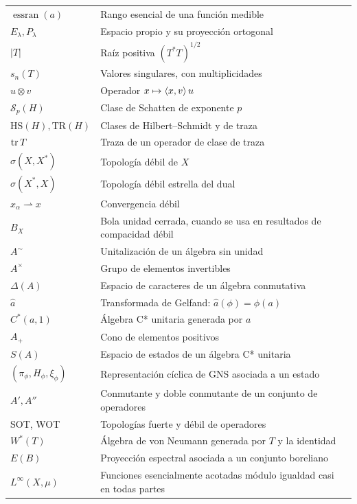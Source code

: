 \begin{longtable}{@{}p{}p{}r@{}}
$\operatorname{essran}(a)$ & Rango esencial de una función medible & \pageref{v3:multiplicadores}\\
$E_\lambda,P_\lambda$ & Espacio propio y su proyección ortogonal & \pageref{v3:espectral-compacto}\\
$|T|$ & Raíz positiva $(T^*T)^{1/2}$ & \pageref{v3:raiz-compacta}\\
$s_n(T)$ & Valores singulares, con multiplicidades & \pageref{v3:singulares}\\
$u\otimes v$ & Operador $x\mapsto\left\langle x,v\right\rangle u$ & \pageref{v3:traza-variacional}\\
$\mathcal S_p(H)$ & Clase de Schatten de exponente $p$ & \pageref{v3:schatten-banach}\\
$\mathrm{HS}(H),\mathrm{TR}(H)$ & Clases de Hilbert--Schmidt y de traza & \pageref{v3:schatten-banach}\\
$\operatorname{tr} T$ & Traza de un operador de clase de traza & \pageref{v3:traza-variacional}\\
$\sigma(X,X^*)$ & Topología débil de $X$ & \pageref{v3:topologia-debil}\\
$\sigma(X^*,X)$ & Topología débil estrella del dual & \pageref{v3:topologia-debil-estrella}\\
$x_\alpha\rightharpoonup x$ & Convergencia débil & \pageref{v3:convergencia-debil}\\
$B_X$ & Bola unidad cerrada, cuando se usa en resultados de compacidad débil & \pageref{v3:alaoglu}\\
$A^\sim$ & Unitalización de un álgebra sin unidad & \pageref{cap:v3-10}\\
$A^\times$ & Grupo de elementos invertibles & \pageref{cap:v3-11}\\
$\Delta(A)$ & Espacio de caracteres de un álgebra conmutativa & \pageref{cap:v3-12}\\
$\widehat a$ & Transformada de Gelfand: $\widehat a(\phi)=\phi(a)$ & \pageref{cap:v3-12}\\
$C^*(a,1)$ & Álgebra C* unitaria generada por $a$ & \pageref{cap:v3-13}\\
$A_+$ & Cono de elementos positivos & \pageref{cap:v3-14}\\
$S(A)$ & Espacio de estados de un álgebra C* unitaria & \pageref{cap:v3-14}\\
$(\pi_\phi,H_\phi,\xi_\phi)$ & Representación cíclica de GNS asociada a un estado & \pageref{cap:v3-15}\\
$A',A''$ & Conmutante y doble conmutante de un conjunto de operadores & \pageref{cap:v3-16}\\
SOT, WOT & Topologías fuerte y débil de operadores & \pageref{cap:v3-16}\\
$W^*(T)$ & Álgebra de von Neumann generada por $T$ y la identidad & \pageref{cap:v3-17}\\
$E(B)$ & Proyección espectral asociada a un conjunto boreliano & \pageref{cap:v3-17}\\
$L^\infty(X,\mu)$ & Funciones esencialmente acotadas módulo igualdad casi en todas partes & \pageref{cap:v3-18}\\
\bottomrule
\end{longtable}
